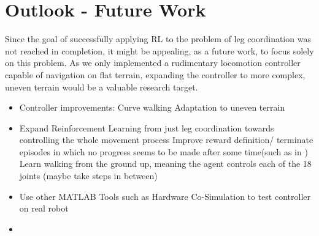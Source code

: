 \section{Outlook - Future Work}

Since the goal of successfully applying RL to the problem of leg coordination was not reached in completion, it might be appealing, as a future work, to focus solely on this problem.
As we only implemented a rudimentary locomotion controller capable of navigation on flat terrain, expanding the controller to more complex, uneven terrain would be a valuable research target.


\begin{itemize}
	
	\item Controller improvements:
		\subitem Curve walking
		\subitem Adaptation to uneven terrain
		\subitem 
	
	\item Expand Reinforcement Learning from just leg coordination towards controlling the whole movement process
		\subitem Improve reward definition/ terminate episodes in which no progress seems to be made after some time(such as in \cite{lillicrap2015continuous})
		\subitem Learn walking from the ground up, meaning the agent controls each of the 18 joints (maybe take steps in between)
		\subitem
	
	\item Use other MATLAB Tools such as Hardware Co-Simulation to test controller on real robot
	
	\item 
	
\end{itemize}
